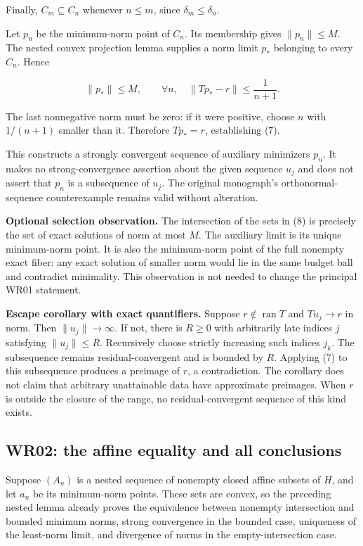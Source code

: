 \documentclass[11pt]{article}
\begin{document}
Finally, \(C_m \subseteq C_n\) whenever \(n \le m\), since
\(\delta_m \le \delta_n\).

Let \(p_n\) be the minimum-norm point of \(C_n\). Its membership gives
\(\|p_n\| \le M\). The nested convex projection lemma supplies a norm
limit \(p_*\) belonging to every \(C_n\). Hence

\[
\|p_*\|\le M,
\qquad
\forall n,\quad\|Tp_*-r\|\le\frac1{n+1}.
\]

The last nonnegative norm must be zero: if it were positive, choose
\(n\) with \(1/(n+1)\) smaller than it. Therefore \(Tp_* = r\),
establishing (7).

This constructs a strongly convergent sequence of auxiliary minimizers
\(p_n\). It makes no strong-convergence assertion about the given
sequence \(u_j\) and does not assert that \(p_n\) is a subsequence of
\(u_j\). The original monograph's orthonormal-sequence counterexample
remains valid without alteration.

\textbf{Optional selection observation.} The intersection of the sets in
(8) is precisely the set of exact solutions of norm at most \(M\). The
auxiliary limit is its unique minimum-norm point. It is also the
minimum-norm point of the full nonempty exact fiber: any exact solution
of smaller norm would lie in the same budget ball and contradict
minimality. This observation is not needed to change the principal WR01
statement.

\textbf{Escape corollary with exact quantifiers.} Suppose
\(r \notin \operatorname{ran} T\) and \(Tu_j \to r\) in norm. Then
\(\|u_j\| \to \infty\). If not, there is \(R \ge 0\) with arbitrarily
late indices \(j\) satisfying \(\|u_j\| \le R\). Recursively choose
strictly increasing such indices \(j_k\). The subsequence remains
residual-convergent and is bounded by \(R\). Applying (7) to this
subsequence produces a preimage of \(r\), a contradiction. The corollary
does not claim that arbitrary unattainable data have approximate
preimages. When \(r\) is outside the closure of the range, no
residual-convergent sequence of this kind exists.

\hypertarget{wr02-the-affine-equality-and-all-conclusions}{%
\subsection{WR02: the affine equality and all
conclusions}\label{wr02-the-affine-equality-and-all-conclusions}}

Suppose \((A_n)\) is a nested sequence of nonempty closed affine subsets
of \(H\), and let \(a_n\) be its minimum-norm points. These sets are
convex, so the preceding nested lemma already proves the equivalence
between nonempty intersection and bounded minimum norms, strong
convergence in the bounded case, uniqueness of the least-norm limit, and
divergence of norms in the empty-intersection case.
\end{document}
